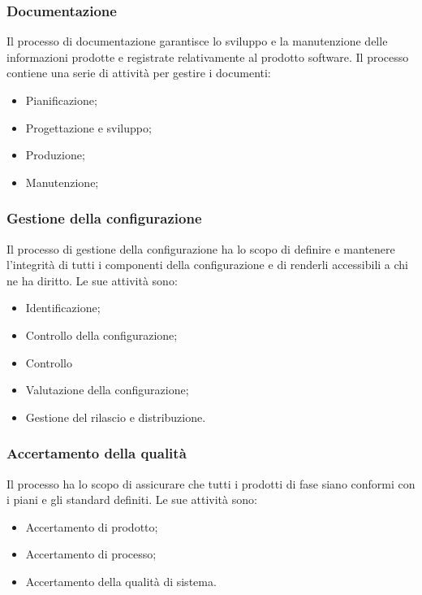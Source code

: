 \subsubsection{Documentazione}
Il processo di documentazione garantisce lo sviluppo e la manutenzione delle informazioni prodotte e registrate relativamente al prodotto software. Il processo contiene una serie di attività per gestire i documenti:
\begin{itemize}

	\item Pianificazione;

	\item Progettazione e sviluppo;
	
	\item Produzione;
	
	\item Manutenzione;

\end{itemize}

\subsubsection{Gestione della configurazione}
Il processo di gestione della configurazione ha lo scopo di definire e mantenere l'integrità di tutti i componenti della configurazione e di renderli accessibili a chi ne ha diritto. Le sue attività sono:
\begin{itemize}

	\item Identificazione;
	
	\item Controllo della configurazione;
	
	\item Controllo 	
	
	\item Valutazione della configurazione;
	
	\item Gestione del rilascio e distribuzione.

\end{itemize}

\subsubsection{Accertamento della qualità}
Il processo ha lo scopo di assicurare che tutti i prodotti di fase siano conformi con i piani e gli standard definiti. 
Le sue attività sono:
\begin{itemize}

	\item Accertamento di prodotto;
	
	\item Accertamento di processo;
	
	\item Accertamento della qualità di sistema.

\end{itemize}

